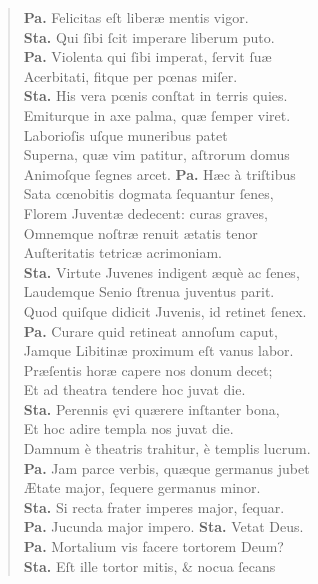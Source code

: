 \documentclass[a4paper,12pt]{article}
\begin{document}
\begin{verse}
\textbf{Pa.} Felicitas eſt liberæ mentis vigor.\\[0pt]
\textbf{Sta.} Qui ſibi ſcit imperare liberum puto.\\[0pt]
\textbf{Pa.} Violenta qui ſibi imperat, ſervit ſuæ\\[0pt]
Acerbitati, fitque per pœnas miſer.\\[0pt]
\textbf{Sta.} His vera pœnis conſtat in terris quies.\\[0pt]
Emiturque in axe palma, quæ ſemper viret.\\[0pt]
Laborioſis uſque muneribus patet\\[0pt]
Superna, quæ vim patitur, aſtrorum domus\\[0pt]
Animoſque ſegnes arcet. \textbf{Pa.} Hæc à triſtibus\\[0pt]
Sata cœnobitis dogmata ſequantur ſenes,\\[0pt]
Florem Juventæ dedecent: curas graves,\\[0pt]
Omnemque noſtræ renuit ætatis tenor\\[0pt]
Auſteritatis tetricæ acrimoniam.\\[0pt]
\textbf{Sta.} Virtute Juvenes indigent æquè ac ſenes,\\[0pt]
Laudemque Senio ſtrenua juventus parit.\\[0pt]
Quod quiſque didicit Juvenis, id retinet ſenex.\\[0pt]
\textbf{Pa.} Curare quid retineat annoſum caput,\\[0pt]
Jamque Libitinæ proximum eſt vanus labor.\\[0pt]
Præſentis horæ capere nos donum decet;\\[0pt]
Et ad theatra tendere hoc juvat die.\\[0pt]
\textbf{Sta.} Perennis ęvi quærere inſtanter bona,\\[0pt]
Et hoc adire templa nos juvat die.\\[0pt]
Damnum è theatris trahitur, è templis lucrum.\\[0pt]
\textbf{Pa.} Jam parce verbis, quæque germanus jubet\\[0pt]
Ætate major, ſequere germanus minor.\\[0pt]
\textbf{Sta.} Si recta frater imperes major, ſequar.\\[0pt]
\textbf{Pa.} Jucunda major impero. \textbf{Sta.} Vetat Deus.\\[0pt]
\textbf{Pa.} Mortalium vis facere tortorem Deum?\\[0pt]
\textbf{Sta.} Eſt ille tortor mitis, \& nocua ſecans\\[0pt]

\end{verse}
\end{document}
